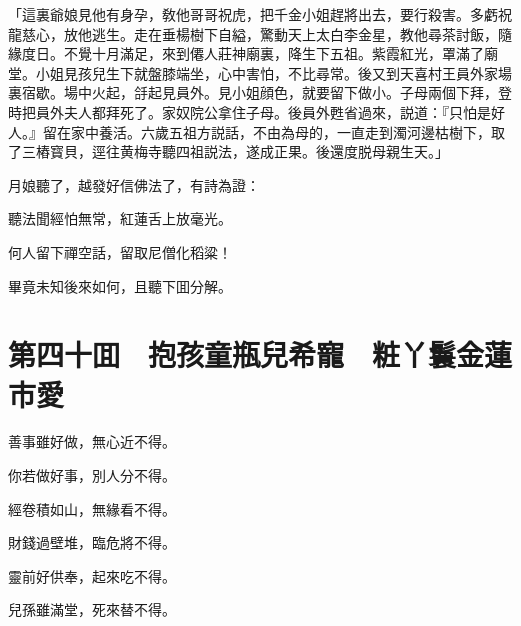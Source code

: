 「這裏爺娘見他有身孕，敎他哥哥祝虎，把千金小姐趕將出去，要行殺害。多虧祝龍慈心，放他逃生。走在垂楊樹下自縊，驚動天上太白李金星，教他尋茶討飯，隨緣度日。不覺十月滿足，來到僊人莊神廟裏，降生下五祖。紫霞紅光，罩滿了廟堂。小姐見孩兒生下就盤膝端坐，心中害怕，不比尋常。後又到天喜村王員外家場裏宿歇。場中火起，㧱起見員外。見小姐顔色，就要留下做小。子母兩個下拜，登時把員外夫人都拜死了。家奴院公拿住子母。後員外甦省過來，説道：『只怕是好人。』留在家中養活。六歲五祖方説話，不由為母的，一直走到濁河邊枯樹下，取了三樁寳貝，逕往黄梅寺聽四祖説法，遂成正果。後還度脱母親生天。」

月娘聽了，越發好信佛法了，有詩為證：

聽法聞經怕無常，紅蓮舌上放毫光。

何人留下禪空話，留取尼僧化稻粱！

畢竟未知後來如何，且聽下囬分解。

\chapter*{第四十囬　抱孩童瓶兒希寵　粧丫鬟金蓮市愛}

善事雖好做，無心近不得。

你若做好事，別人分不得。

經卷積如山，無緣看不得。

財錢過壁堆，臨危將不得。

靈前好供奉，起來吃不得。

兒孫雖滿堂，死來替不得。

